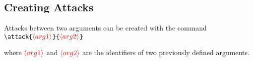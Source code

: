 \documentclass{article}
\newcommand{\tikzname}{Ti\emph{k}Z\xspace}
\newcommand{\opt}[2][red]{\ensuremath{\textcolor{#1}{\langle #2\rangle}}}
\begin{document}
    

\subsection{Creating Attacks}
    Attacks between two arguments can be created with the command\\

    \noindent
    \verb|\attack{|\opt{arg1}\verb|}{|\opt{arg2}\verb|}|

    \begin{list}{}{\leftmargin=\parindent\rightmargin=0pt}
        \item where \opt{arg1} and \opt{arg2} are the identifiers of two previously defined arguments.
    \end{list}

    
\end{document}
